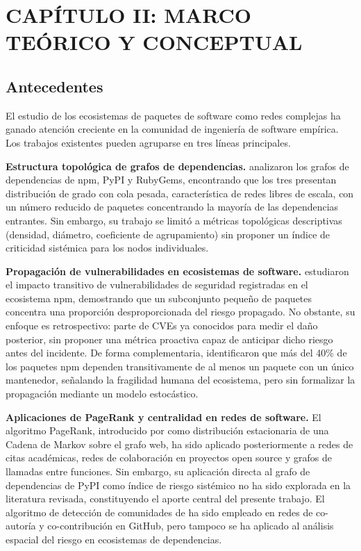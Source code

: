 \section{CAPÍTULO II: MARCO TEÓRICO Y CONCEPTUAL}

\subsection{Antecedentes}

El estudio de los ecosistemas de paquetes de software como redes complejas 
ha ganado atención creciente en la comunidad de ingeniería de software empírica.
Los trabajos existentes pueden agruparse en tres líneas principales.

\textbf{Estructura topológica de grafos de dependencias.}
\textcite{kikas2017structure} analizaron los grafos de dependencias de npm, 
PyPI y RubyGems, encontrando que los tres presentan distribución de grado 
con cola pesada, característica de redes libres de escala, con un número 
reducido de paquetes concentrando la mayoría de las dependencias entrantes. 
Sin embargo, su trabajo se limitó a métricas topológicas descriptivas 
(densidad, diámetro, coeficiente de agrupamiento) sin proponer un índice 
de criticidad sistémica para los nodos individuales.

\textbf{Propagación de vulnerabilidades en ecosistemas de software.}
\textcite{decan2019impact} estudiaron el impacto transitivo de vulnerabilidades 
de seguridad registradas en el ecosistema npm, demostrando que un subconjunto 
pequeño de paquetes concentra una proporción desproporcionada del riesgo 
propagado. No obstante, su enfoque es retrospectivo: parte de CVEs ya 
conocidos para medir el daño posterior, sin proponer una métrica proactiva 
capaz de anticipar dicho riesgo antes del incidente. De forma complementaria, 
\textcite{zimmermann2019small} identificaron que más del 40\% de los paquetes 
npm dependen transitivamente de al menos un paquete con un único mantenedor, 
señalando la fragilidad humana del ecosistema, pero sin formalizar la 
propagación mediante un modelo estocástico.

\textbf{Aplicaciones de PageRank y centralidad en redes de software.}
El algoritmo PageRank, introducido por \textcite{brin1998anatomy} como 
distribución estacionaria de una Cadena de Markov sobre el grafo web, ha 
sido aplicado posteriormente a redes de citas académicas, redes de 
colaboración en proyectos open source y grafos de llamadas entre funciones. 
Sin embargo, su aplicación directa al grafo de dependencias de PyPI como 
índice de riesgo sistémico no ha sido explorada en la literatura revisada, 
constituyendo el aporte central del presente trabajo. El algoritmo de 
detección de comunidades de \textcite{blondel2008louvain} ha sido empleado 
en redes de co-autoría y co-contribución en GitHub, pero tampoco se ha 
aplicado al análisis espacial del riesgo en ecosistemas de dependencias.

